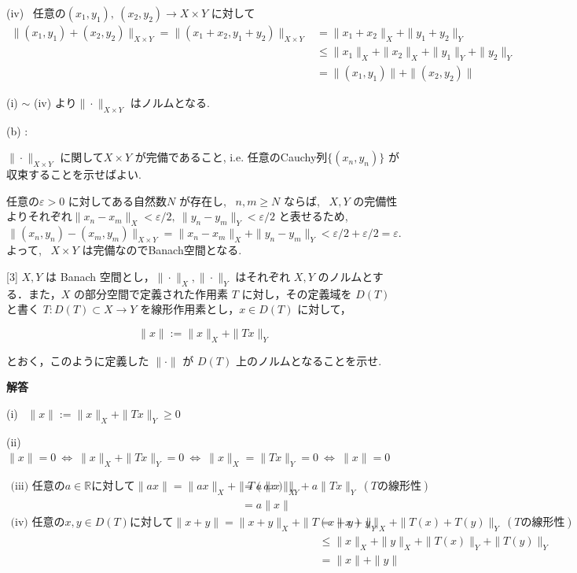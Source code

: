\documentclass{jsarticle}
\begin{document}
(iv) \ 任意の$(x_1, y_1), \ (x_2, y_2) \to X \times Y$ に対して
$$
\begin{aligned}
\|(x_1, y_1) + (x_2, y_2)\|_{X\times Y} = \|(x_1 + x_2, y_1 + y_2)\|_{X\times Y} 
&= \|x_1 + x_2\|_X + \|y_1 + y_2\|_Y \\
&\le \|x_1\|_X + \|x_2\|_X + \|y_1\|_Y + \|y_2\|_Y \\
&= \|(x_1, y_1)\| + \|(x_2, y_2)\|  
\end{aligned}
$$

(i) $\sim$ (iv) より$\|\cdot\|_{X \times Y}$ はノルムとなる.

\bigskip

(b) :

$\|\cdot\|_{X \times Y}$ に関して$X \times Y$ が完備であること, i.e. 任意のCauchy列$\{(x_n, y_n)\}$ が収束することを示せばよい.

任意の$\varepsilon > 0$ に対してある自然数$N$ が存在し, \ $n, m \ge N$ ならば, \ $X, Y$ の完備性よりそれぞれ$\|x_n - x_m\|_X < \varepsilon/2, \ \|y_n - y_m\|_Y < \varepsilon/2$ と表せるため, \ 
$$
\|(x_n, y_n) - (x_m, y_m)\|_{X\times Y} = \|x_n - x_m\|_X + \|y_n - y_m\|_Y < \varepsilon/2 + \varepsilon/2 = \varepsilon.
$$
よって, \ $X \times Y$ は完備なのでBanach空間となる.
 
 
\bigskip
\bigskip

\begin{itembox}[l]{[3]}
$X, Y$ は Banach 空間とし，$\|\cdot\|_{X},\|\cdot\|_{Y}$ はそれぞれ $X, Y$ のノルムとする．また，$X$ の部分空間で定義された作用素 $T$ に対し，その定義域を $D(T)$ と書く $T: D(T) \subset X \rightarrow Y$ を線形作用素とし，$x \in D(T)$ に対して，

$$
\|x\|:=\|x\|_{X}+\|T x\|_{Y}
$$

とおく，このように定義した $\|\cdot\|$ が $D(T)$ 上のノルムとなることを示せ.
\end{itembox}

\textbf{解答}

(i) \ $\|x\|:=\|x\|_{X}+\|T x\|_{Y} \ge 0$

(ii) \ $\|x\| = 0 \ \Longleftrightarrow \ \|x\|_{X}+\|T x\|_{Y} = 0 \ \Longleftrightarrow \ \|x\|_X = \|Tx\|_Y = 0 \ \Longleftrightarrow \ \|x\| = 0$

$\begin{aligned}
\text{(iii) \ 任意の$a \in \mathbb{R}$に対して} \|ax\| = \|ax\|_X + \|T(ax)\|_Y 
&= a\|x\|_X + a\|Tx\|_Y \ (Tの線形性) \\
&= a\|x\|
\end{aligned}$
$$
\begin{aligned}
\text{(iv) \ 任意の} x, y \in D(T) \text{に対して} \|x + y\| = \|x + y\|_X + \|T(x + y)\|_Y
&= \|x + y\|_X + \|T(x) + T(y)\|_Y \ (Tの線形性) \\
&\le \|x\|_X + \|y\|_X + \|T(x)\|_Y + \|T(y)\|_Y \\
&= \|x\| + \|y\|
\end{aligned}
$$
\end{document}
